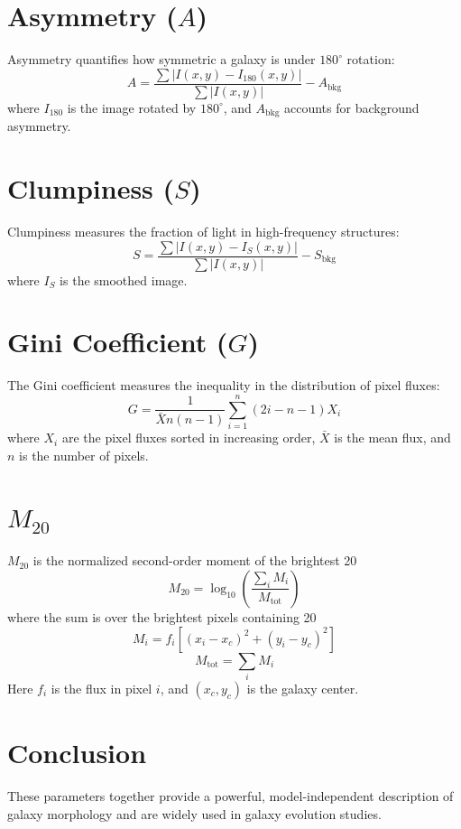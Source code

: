 \documentclass[11pt]{article}
\begin{document}
\section{Asymmetry ($A$)}
Asymmetry quantifies how symmetric a galaxy is under $180^\circ$ rotation:
\begin{equation}
A = \frac{\sum | I(x,y) - I_{180}(x,y) |}{\sum | I(x,y) |} - A_{\text{bkg}}
\end{equation}
where $I_{180}$ is the image rotated by $180^\circ$, and $A_{\text{bkg}}$ accounts for background asymmetry.

\section{Clumpiness ($S$)}
Clumpiness measures the fraction of light in high-frequency structures:
\begin{equation}
S = \frac{\sum | I(x,y) - I_{S}(x,y) |}{\sum | I(x,y) |} - S_{\text{bkg}}
\end{equation}
where $I_S$ is the smoothed image.

\section{Gini Coefficient ($G$)}
The Gini coefficient measures the inequality in the distribution of pixel fluxes:
\begin{equation}
G = \frac{1}{\bar{X} n (n-1)} \sum_{i=1}^{n} (2i - n - 1) X_i
\end{equation}
where $X_i$ are the pixel fluxes sorted in increasing order, $\bar{X}$ is the mean flux, and $n$ is the number of pixels.

\section{$M_{20}$}
$M_{20}$ is the normalized second-order moment of the brightest 20%
\begin{equation}
M_{20} = \log_{10} \left( \frac{\sum_i M_i}{M_{\text{tot}}} \right)
\end{equation}
where the sum is over the brightest pixels containing 20%
\begin{equation}
M_i = f_i \left[ (x_i - x_c)^2 + (y_i - y_c)^2 \right]
\end{equation}
\begin{equation}
M_{\text{tot}} = \sum_i M_i
\end{equation}
Here $f_i$ is the flux in pixel $i$, and $(x_c, y_c)$ is the galaxy center.

\section{Conclusion}
These parameters together provide a powerful, model-independent description of galaxy morphology and are widely used in galaxy evolution studies.
\end{document}
